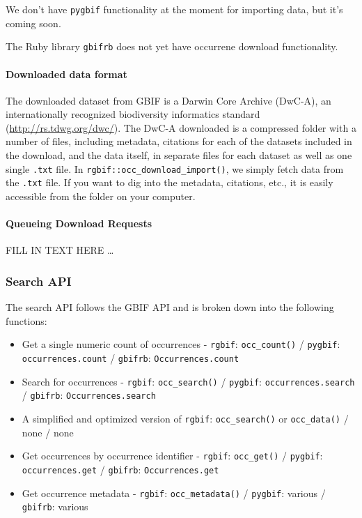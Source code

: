 \documentclass[author-year, review, 11pt]{components/elsarticle} %
\def\tightlist{}
\begin{document}
We don't have \texttt{pygbif} functionality at the moment for importing
data, but it's coming soon.

The Ruby library \texttt{gbifrb} does not yet have occurrene download
functionality.

\paragraph{Downloaded data format}\label{downloaded-data-format}

The downloaded dataset from GBIF is a Darwin Core Archive (DwC-A), an
internationally recognized biodiversity informatics standard
(\url{http://rs.tdwg.org/dwc/}). The DwC-A downloaded is a compressed
folder with a number of files, including metadata, citations for each of
the datasets included in the download, and the data itself, in separate
files for each dataset as well as one single \texttt{.txt} file. In
\texttt{rgbif::occ\_download\_import()}, we simply fetch data from the
\texttt{.txt} file. If you want to dig into the metadata, citations,
etc., it is easily accessible from the folder on your computer.

\paragraph{Queueing Download Requests}\label{queueing-download-requests}

FILL IN TEXT HERE \ldots{}

\subsubsection{Search API}\label{search-api}

The search API follows the GBIF API and is broken down into the
following functions:

\begin{itemize}
\tightlist
\item
  Get a single numeric count of occurrences - \texttt{rgbif}:
  \texttt{occ\_count()} / \texttt{pygbif}: \texttt{occurrences.count} /
  \texttt{gbifrb}: \texttt{Occurrences.count}
\item
  Search for occurrences - \texttt{rgbif}: \texttt{occ\_search()} /
  \texttt{pygbif}: \texttt{occurrences.search} / \texttt{gbifrb}:
  \texttt{Occurrences.search}
\item
  A simplified and optimized version of \texttt{rgbif}:
  \texttt{occ\_search()} or \texttt{occ\_data()} / none / none
\item
  Get occurrences by occurrence identifier - \texttt{rgbif}:
  \texttt{occ\_get()} / \texttt{pygbif}: \texttt{occurrences.get} /
  \texttt{gbifrb}: \texttt{Occurrences.get}
\item
  Get occurrence metadata - \texttt{rgbif}: \texttt{occ\_metadata()} /
  \texttt{pygbif}: various / \texttt{gbifrb}: various
\end{itemize}
\end{document}

